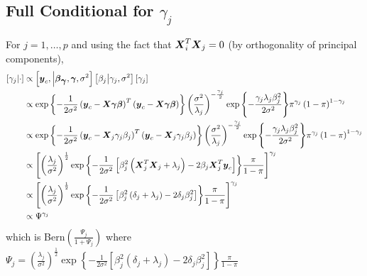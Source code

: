 \documentclass[fleqn]{article}
\def\bm#1{\mbox{\boldmath $#1$}}
\begin{document}
\subsection{Full Conditional for $\gamma_j$}
%
For $j = 1, \ldots, p$ and using the fact that $\bm{X}_i^T \bm{X}_j = 0$ (by orthogonality of principal components), %
%
\begin{align*}
%
\left[ \gamma_j \middle| \cdot \right] & \propto \left[ \bm{y}_c, \middle| \bm{\beta}_{\bm{\gamma}}, \bm{\gamma}, \sigma^2 \right] \left[ \beta_j \middle| \gamma_j, \sigma^2 \right] \left[ \gamma_j \right] \\
%
& \propto \exp{ \left\{ - \frac{1} {2 \sigma^2} \left( \bm{y}_c - \bm{X} \bm{\gamma} \bm{\beta} \right)^T \left( \bm{y}_c - \bm{X} \bm{\gamma} \bm{\beta} \right) \right\} } \left( \frac{\sigma^2} {\lambda_j} \right)^{ - \frac{\gamma_j} {2} } \exp{ \left\{ - \frac{\gamma_j \lambda_j \beta_j^2} {2 \sigma^2} \right\} } \pi^{\gamma_j} \left( 1 - \pi \right)^{1 - \gamma_j} \\
%
& \propto \exp{ \left\{ - \frac{1} {2 \sigma^2} \left( \bm{y}_c - \bm{X}_{j} \gamma_j \beta_j \right)^T \left( \bm{y}_c - \bm{X}_{j} \gamma_j \beta_j \right) \right\} } \left( \frac{\sigma^2} {\lambda_j} \right)^{ - \frac{\gamma_j} {2} } \exp{ \left\{ - \frac{\gamma_j \lambda_j \beta_j^2} {2 \sigma^2} \right\} } \pi^{\gamma_j} \left( 1 - \pi \right)^{1 - \gamma_j} \\
%
& \propto \left[ \left( \frac{\lambda_j} {\sigma^2} \right)^{ \frac{1} {2} } \exp{ \left\{ - \frac{1} {2 \sigma^2} \left[ \beta_j^2 \left( \bm{X}_{j}^T \bm{X}_{j} + \lambda_j \right) - 2 \beta_j \bm{X}_{j}^T \bm{y}_c \right] \right\} } \frac{\pi} {1 - \pi }\right]^{\gamma_j} \\
%
& \propto \left[ \left( \frac{\lambda_j} {\sigma^2} \right)^{ \frac{1} {2} } \exp{ \left\{ - \frac{1} {2 \sigma^2} \left[ \beta_j^2 \left( \delta_j + \lambda_j \right) - 2 \delta_j \beta_j^2 \right] \right\} } \frac{\pi} {1 - \pi } \right]^{\gamma_j} \\
%
& \propto \Psi^{\gamma_j}
%
\end{align*}
%
which is Bern$\left( \frac{\Psi_j} {1 + \Psi_j} \right)$ where $\Psi_j =  \left( \frac{\lambda_j} {\sigma^2} \right)^{ \frac{1} {2} } \exp{ \left\{ - \frac{1} {2 \sigma^2} \left[ \beta_j^2 \left( \delta_j + \lambda_j \right) - 2 \delta_j \beta_j^2 \right] \right\} } \frac{\pi} {1 - \pi }$
%
\end{document}
